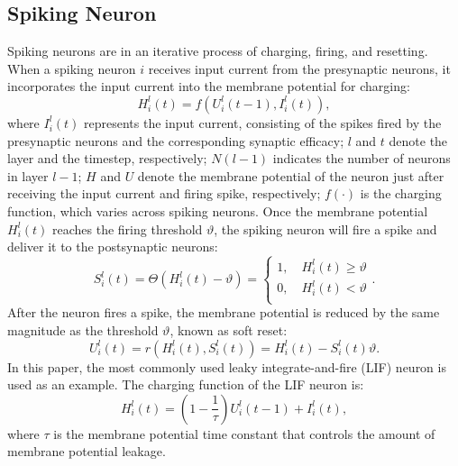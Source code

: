\documentclass[letterpaper]{article} %
\begin{document}
\subsection{Spiking Neuron}
Spiking neurons are in an iterative process of charging, firing, and resetting. When a spiking neuron $i$ receives input current from the presynaptic neurons, it incorporates the input current into the membrane potential for charging:
\begin{equation}
H_{i}^{l}(t) = f(U_{i}^{l}(t-1),I_{i}^{l}(t)),
\label{eq1}
\end{equation}
where $I_{i}^{l}(t)$ represents the input current, consisting of the spikes fired by the presynaptic neurons and the corresponding synaptic efficacy; $l$ and $t$ denote the layer and the timestep, respectively; $N(l-1)$ indicates the number of neurons in layer $l-1$; $H$ and $U$ denote the membrane potential of the neuron just after receiving the input current and firing spike, respectively; $f(\cdot)$ is the charging function, which varies across spiking neurons.
Once the membrane potential $H_{i}^{l}(t)$ reaches the firing threshold $\vartheta$, the spiking neuron will fire a spike and deliver it to the postsynaptic neurons:
\begin{equation}
S_{i}^{l}(t) = \Theta(H_{i}^{l}(t)-\vartheta)=\left\{
\begin{array}{cl}
1,\quad H_{i}^{l}(t) \ge \vartheta \\
0,\quad H_{i}^{l}(t) < \vartheta \\
\end{array}.
\right.
\label{eq2}
\end{equation}
After the neuron fires a spike, the membrane potential is reduced by the same magnitude as the threshold $\vartheta$, known as soft reset:
\begin{equation}
U_{i}^{l}(t) = r(H_{i}^{l}(t),S_{i}^{l}(t))=H_{i}^{l}(t)-S_{i}^{l}(t)\vartheta.
\label{eq4}
\end{equation}
In this paper, the most commonly used leaky integrate-and-fire (LIF) \cite{MLF} neuron is used as an example. The charging function of the LIF neuron is:
\begin{equation}
H_{i}^{l}(t)=\left(1-\frac{1}{\tau}\right) U_{i}^{l}(t-1)+I_{i}^{l}(t),
\label{eq5}
\end{equation}
where $\tau$ is the membrane potential time constant that controls the amount of membrane potential leakage.
\end{document}
